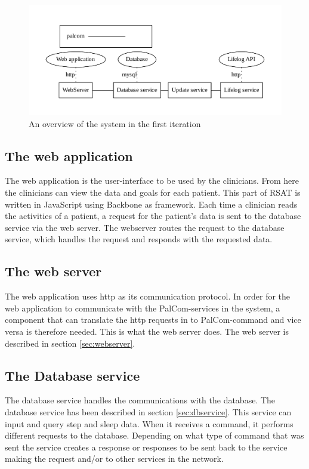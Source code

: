 \documentclass{cslthse-msc}
\begin{document}
\begin{figure}[!hbt]
\centering
\includegraphics[scale=0.75]{second-version.pdf} 
\caption{An overview of the system in the first iteration}\label{fig:second-version}
\end{figure}

\subsection{The web application}

The web application is the user-interface to be used by the clinicians. From here the clinicians can view the data and goals for each patient. This part of RSAT is written in JavaScript using Backbone as framework. Each time a clinician reads the activities of a patient, a request for the patient’s data is sent to the database service via the web server.  The webserver routes the request to the database service, which handles the request and responds with the requested data.

\subsection{The web server}

The web application uses http as its communication protocol. In order for the web application to communicate with the PalCom-services in the system, a component that can translate the http requests in to PalCom-command and vice versa is therefore needed. This is what the web server does. The web server is described in section \ref{sec:webserver}. 


\subsection{The Database service}

The database service handles the communications with the database. The database service has been described in section \ref{sec:dbservice}. This service can input and query step and sleep data. When it receives a command, it performs different requests to the database. Depending on what type of command that was sent the service creates a response or responses to be sent back to the service making the request and/or to other services in the network.
\end{document}
